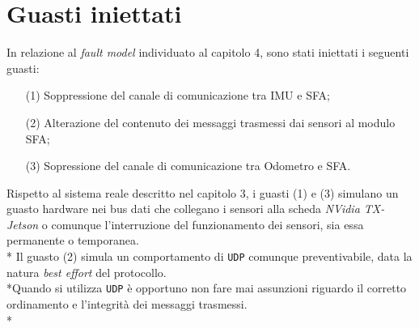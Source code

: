 \section{Guasti iniettati}
In relazione al \emph{fault model} individuato al capitolo 4, sono stati iniettati i seguenti guasti:
\begin{enumerate}
	\item[(1)] Soppressione del canale di comunicazione tra IMU e SFA;
	\item[(2)] Alterazione del contenuto dei messaggi trasmessi dai sensori al modulo SFA;
	\item[(3)] Sopressione del canale di comunicazione tra Odometro e SFA.
\end{enumerate}
Rispetto al sistema reale descritto nel capitolo 3, i guasti (1) e (3) simulano un guasto hardware nei bus dati che collegano i sensori alla scheda \emph{NVidia TX-Jetson} o comunque l'interruzione del funzionamento dei sensori, sia essa permanente o temporanea.\\*
Il guasto (2) simula un comportamento di \texttt{UDP} comunque preventivabile, data la natura \emph{best effort} del protocollo.\\*Quando si utilizza \texttt{UDP} \`e opportuno non fare mai assunzioni riguardo il corretto ordinamento e l'integrit\`a dei messaggi trasmessi.\\*
